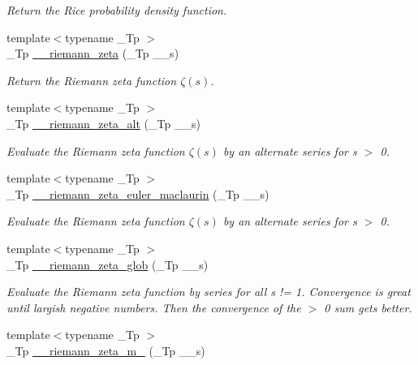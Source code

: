 \begin{DoxyCompactItemize}
\begin{DoxyCompactList}\small\item\em Return the Rice probability density function. \end{DoxyCompactList}\item 
{\footnotesize template$<$typename \+\_\+\+Tp $>$ }\\\+\_\+\+Tp \hyperlink{namespacestd_1_1____detail_a2be77d9bdd1b8b463be44a0e7558bc2a}{\+\_\+\+\_\+riemann\+\_\+zeta} (\+\_\+\+Tp \+\_\+\+\_\+s)
\begin{DoxyCompactList}\small\item\em Return the Riemann zeta function $ \zeta(s) $. \end{DoxyCompactList}\item 
{\footnotesize template$<$typename \+\_\+\+Tp $>$ }\\\+\_\+\+Tp \hyperlink{namespacestd_1_1____detail_a4b3f83cafed65af679eedcf37fefff00}{\+\_\+\+\_\+riemann\+\_\+zeta\+\_\+alt} (\+\_\+\+Tp \+\_\+\+\_\+s)
\begin{DoxyCompactList}\small\item\em Evaluate the Riemann zeta function $ \zeta(s) $ by an alternate series for s $>$ 0. \end{DoxyCompactList}\item 
{\footnotesize template$<$typename \+\_\+\+Tp $>$ }\\\+\_\+\+Tp \hyperlink{namespacestd_1_1____detail_a84ac805996c4eeb8cbfa181e6e47f0ae}{\+\_\+\+\_\+riemann\+\_\+zeta\+\_\+euler\+\_\+maclaurin} (\+\_\+\+Tp \+\_\+\+\_\+s)
\begin{DoxyCompactList}\small\item\em Evaluate the Riemann zeta function $ \zeta(s) $ by an alternate series for s $>$ 0. \end{DoxyCompactList}\item 
{\footnotesize template$<$typename \+\_\+\+Tp $>$ }\\\+\_\+\+Tp \hyperlink{namespacestd_1_1____detail_ab3542ea44b34da3d4865ed9a014e2951}{\+\_\+\+\_\+riemann\+\_\+zeta\+\_\+glob} (\+\_\+\+Tp \+\_\+\+\_\+s)
\begin{DoxyCompactList}\small\item\em Evaluate the Riemann zeta function by series for all s != 1. Convergence is great until largish negative numbers. Then the convergence of the $>$ 0 sum gets better. \end{DoxyCompactList}\item 
{\footnotesize template$<$typename \+\_\+\+Tp $>$ }\\\+\_\+\+Tp \hyperlink{namespacestd_1_1____detail_a174bfa28eeb176b90ff251b5affbecb2}{\+\_\+\+\_\+riemann\+\_\+zeta\+\_\+m\+\_} (\+\_\+\+Tp \+\_\+\+\_\+s)

\end{DoxyCompactItemize}
